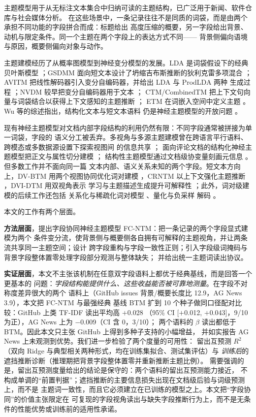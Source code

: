 \documentclass[11pt]{ctexart}
\newcommand{\fcntm}{FC-NTM}
\begin{document}
主题模型用于从无标注文本集合中归纳可读的主题结构，已广泛用于新闻、软件仓库与社会媒体分析。
在这些场景中，一条记录往往不是同质的词袋，而是由两个承担不同功能的字段拼合而成：标题给出
高度压缩的概要，另一字段给出背景、动机与限定条件。同一个主题在两个字段上的表达方式不同——
背景侧偏向语境与原因，概要侧偏向对象与动作。

主题建模经历了从概率图模型到神经变分模型的发展。LDA 是词袋假设下的经典贝叶斯模型
\cite{blei2003lda}；GSDMM 面向短文本设计了坍缩吉布斯推断的狄利克雷多项混合
\cite{yin2014gsdmm}；AVITM 把线性解码器引入变分自编码器，并给出 LDA 与 ProdLDA 两种
生成过程
\cite{srivastava2017avitm}；NVDM 较早把变分自编码器用于文本 \cite{miao2016nvdm}；
CTM/CombinedTM 把上下文句向量与词袋结合以获得上下文感知的主题推断 \cite{bianchi2021ctm}；
ETM 在词嵌入空间中定义主题 \cite{dieng2020etm}。Wu 等的综述指出，结构化文本与短文本语料
仍是神经主题模型的开放问题 \cite{wu2024survey}。

现有神经主题模型对文档内部字段结构的利用仍然有限：不同字段通常被拼接为单一词袋，字段的
语义分工被丢弃。多视角与多源主题建模曾在跨语言平行语料、跨模态或多数据源设置下探索视图间
的信息共享 \cite{kurle2019multisource,zhang2017robust,pergola2021disentangled,liu2022dualview}；
面向评论文档的结构化神经主题模型把正文与属性切分建模 \cite{esmaeili2019structured}；
结构性主题模型通过文档级协变量刻画元信息 \cite{roberts2019stm}。但多数工作并不面向同一篇
文本内部、语义关系未知的两个字段。短文本方向上，DV-BTM 用两个视图协同优化词对建模
\cite{dvbtm2022}，CRNTM 以上下文强化主题推断 \cite{crntm2020}，DVI-DTM 用双视角表示
学习与主题描述生成提升可解释性 \cite{dvidtm2026}；此外，词对级建模的后续工作还包括
关系化与稀疏化词对模型 \cite{relationalbtm2018,sparsebtm2021}、量化与负采样
解码 \cite{quantization2020}。

本文的工作有两个层面。

\textbf{方法层面}，提出字段协同神经主题模型 \fcntm：把一条记录的两个字段显式建模为两个
条件变分流，使背景侧与概要侧各自拥有可解释的主题视角，并让两条流共享同一主题空间；设计
跨字段重构与字段一致性正则；引入字段级词掩码与背景字段整体置零处理字段部分观测与整体缺失；
并给出统一主题词读出协议。

\textbf{实证层面}，本文不主张该机制在任意双字段语料上都优于经典基线，而是回答一个更基本的
问题：\emph{字段结构能提供什么、这些收益能否被可靠地测量}。在字段不对称度差异很大的两个
语料上（GitHub issues 背景/概要长度比 12.9，AG News 3.9），本文把 \fcntm{} 与最强经典
基线 BTM 扩到 10 个种子做同口径配对比较：GitHub 上类 TF-IDF 读出平均高 $+$0.028
（95\% CI [$+$0.012, $+$0.043]，9/10 为正），AG News 上为 $-$0.009（CI 含 0，3/10）；
两个语料的 $\beta$ 读出都低于 BTM。因此本文只主张 GitHub 上得到多种子支持的小幅增益，
并如实报告 AG News 上未观测到优势。我们进一步检验了两个度量的可用性：
留出互预测 $R^2$（双向 Ridge 与典型相关两种形式，均在训练集拟合、测试集评估）与
\emph{训练后}的遮挡推断诊断（推理期把背景字段整体置零并重新推断主题比例）。
需要强调的是，留出互预测度量给出的结论是保守的：两个语料的留出互预测能力接近，
不构成单调的“前置判据”；遮挡推断的主要信息损失出现在文档级后验与词级预测上，而不是
主题词一致性，而且它必须建立在已训练的模型之上。本文把“字段协同”的价值主张限定在
可复现的字段视角读出与缺失字段推断行为上，而不是无条件的性能优势或训练前的适用性承诺。
\end{document}
